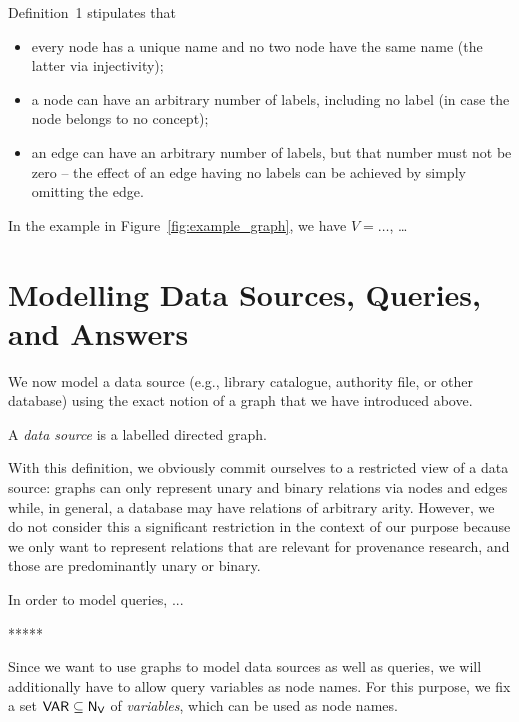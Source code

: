 %
Definition~1 stipulates that
%
\begin{itemize}
  \item
    every node has a unique name and no two node have the same name (the latter via injectivity);
  \item
    a node can have an arbitrary number of labels, including no label (in case the node belongs to no concept);
  \item
    an edge can have an arbitrary number of labels, but that number must not be zero --
    the effect of an edge having no labels can be achieved by simply omitting the edge.
\end{itemize}

In the example in Figure~\ref{fig:example_graph},
we have $V = \dots$, \dots{}

\section{Modelling Data Sources, Queries, and Answers}

We now model a data source (e.g., library catalogue, authority file, or other database)
using the exact notion of a graph that we have introduced above.
%
\begin{definition}
  A \emph{data source} is a labelled directed graph.
\end{definition}
%
With this definition, we obviously commit ourselves to a restricted view of a data source:
graphs can only represent unary and binary relations via nodes and edges
while, in general, a database may have relations of arbitrary arity.
However, we do not consider this a significant restriction in the context of our purpose
because we only want to represent relations that are relevant for provenance research,
and those are predominantly unary or binary. 



In order to model queries, ...


*****


Since we want to use graphs to model data sources as well as queries,
we will additionally have to allow query variables as node names.
For this purpose, we fix a set $\mathsf{VAR} \subseteq \mathsf{N}_\mathsf{V}$ of \emph{variables},
which can be used as node names.

